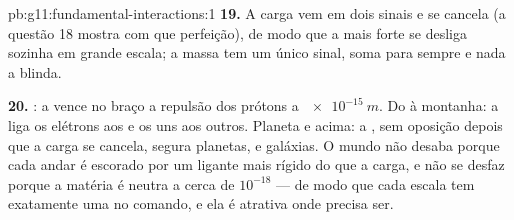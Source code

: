 \begin{solution}{pb:g11:fundamental-interactions:1}
\textbf{19.} A carga vem em dois sinais e se cancela (a questão 18 mostra
com que perfeição), de modo que a  mais forte se desliga sozinha em
grande escala; a massa tem um único sinal, soma para sempre e nada a
blinda.

\textbf{20.} : a  vence no braço a repulsão dos
prótons a $\qty{e-15}{m}$. Do  à montanha: a  liga os elétrons aos  e os  uns aos outros.
Planeta e acima: a , sem oposição depois que a carga se
cancela, segura planetas,  e galáxias. O mundo não desaba porque
cada andar é escorado por um ligante mais rígido do que a carga, e não se
desfaz porque a matéria é neutra a cerca de $10^{-18}$ --- de modo que
cada escala tem exatamente uma  no comando, e ela é atrativa onde
precisa ser.
\end{solution}
